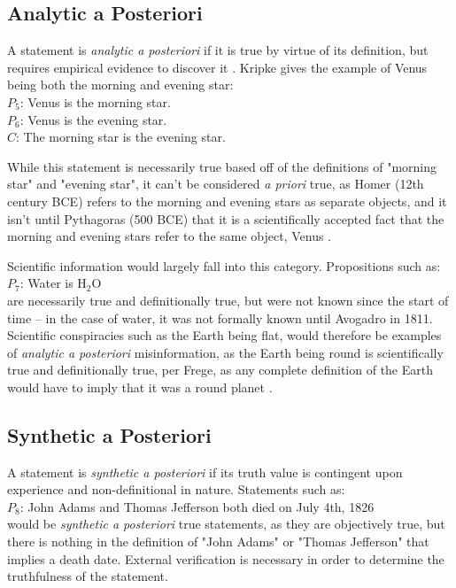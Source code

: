 \documentclass[NETN,manuscript]{stjour-new}
\begin{document}
\subsection{Analytic a Posteriori}
A statement is \textit{analytic a posteriori} if it is true by virtue of its definition, but requires empirical evidence to discover it \citep{kripke1972naming}. Kripke gives the example of Venus being both the morning and evening star: \\
$P_5$: Venus is the morning star.\\
$P_6$: Venus is the evening star.\\
$C$: The morning star is the evening star.

While this statement is necessarily true based off of the definitions of "morning star" and "evening star", it can't be considered \textit{a priori} true, as Homer (12th century BCE) refers to the morning and evening stars as separate objects, and it isn't until Pythagoras (500 BCE) that it is a scientifically accepted fact that the morning and evening stars refer to the same object, Venus \citep{dunne1978voyage}.

Scientific information would largely fall into this category. Propositions such as: \\
$P_7$: Water is H$_2$O \\
are necessarily true and definitionally true, but were not known since the start of time -- in the case of water, it was not formally known until Avogadro in 1811. Scientific conspiracies such as the Earth being flat, would therefore be examples of \textit{analytic a posteriori} misinformation, as the Earth being round is scientifically true and definitionally true, per Frege, as any complete definition of the Earth would have to imply that it was a round planet \citep{frege2003sense}.

\subsection{Synthetic a Posteriori}
A statement is \textit{synthetic a posteriori} if its truth value is contingent upon experience and non-definitional in nature. Statements such as: \\
$P_8$: John Adams and Thomas Jefferson both died on July 4th, 1826\\
would be \textit{synthetic a posteriori} true statements, as they are objectively true, but there is nothing in the definition of "John Adams" or "Thomas Jefferson" that implies a death date. External verification is necessary in order to determine the truthfulness of the statement.
\end{document}

